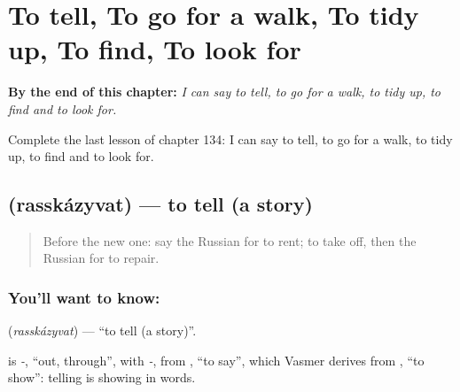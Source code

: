 
\chapter{To tell, To go for a walk, To tidy up, To find, To look for}
\label{ch:ru-to-tell-to-go-for-a-walk-to-tidy-up-to-find-to-look-for}

\begin{chapteropening}
\textbf{By the end of this chapter:} \emph{I can say to tell, to go for a walk, to tidy up, to find and to look for.}

Complete the last lesson of chapter 134: I can say to tell, to go for a walk, to tidy up, to find and to look for.
\end{chapteropening}

\section[\texorpdfstring{\ru{рассказывать} (rasskázyvat)}{рассказывать (rasskázyvat)}]{ (rasskázyvat) — to tell (a story)}

\label{lesson:RU-C134-to-tell}



\begin{quote}
Before the new one: say the Russian for to rent; to take off, then the Russian for to repair.
\end{quote}

\subsection*{You'll want to know: }
\textbf{} (\emph{rasskázyvat}) — \textquotedblleft{}to tell (a story)\textquotedblright{}.

\begin{cousinweb}
\textbf{} is \emph{-}, \textquotedblleft{}out, through\textquotedblright{}, with \emph{-}, from \emph{}, \textquotedblleft{}to say\textquotedblright{}, which Vasmer derives from \emph{}, \textquotedblleft{}to show\textquotedblright{}: telling is showing in words.
\end{cousinweb}

